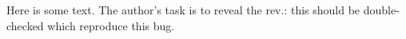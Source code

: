 Here is some text.
The author's task is to reveal the %
{rev.: this should be double-checked}%
which reproduce this bug.
